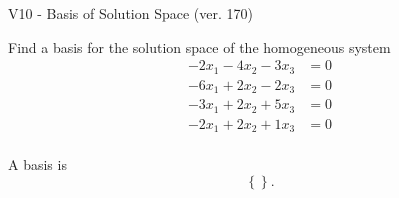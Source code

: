 \begin{exercise}
  \begin{exerciseTitle}V10 - Basis of Solution Space (ver. 170)\end{exerciseTitle}
  \begin{exerciseStatement}
    Find a basis for the solution space of the homogeneous system 
\begin{align*}
 -2 x_ 1 -4 x_ 2 -3 x_ 3 &= 0  \\ 
  -6 x_ 1 + 2 x_ 2 -2 x_ 3 &= 0  \\ 
  -3 x_ 1 + 2 x_ 2 + 5 x_ 3 &= 0  \\ 
  -2 x_ 1 + 2 x_ 2 + 1 x_ 3 &= 0  \\ 
 \end{align*}


 
  \end{exerciseStatement}

  \begin{exerciseAnswer}
   A basis is   
\[\left\{\right\}.\]

  


  \end{exerciseAnswer}
\end{exercise}